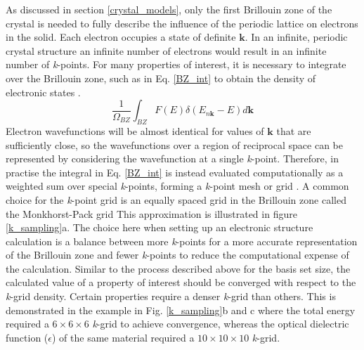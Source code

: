 \documentclass[11pt, twoside]{report}
\begin{document}
As discussed in section \ref{crystal_models}, only the first Brillouin zone of the crystal is needed to fully describe the influence of the periodic lattice on electrons in the solid.
Each electron occupies a state of definite $\mathbf{k}$. In an infinite, periodic crystal structure an infinite number of electrons would result in an infinite number of \textit{k}-points. For many properties of interest, it is necessary to integrate over the Brillouin zone, such as in Eq. \ref{BZ_int} to obtain the density of electronic states \cite{vasp_k-sampling_slides}.
\begin{equation}\label{BZ_int}
\frac{1}{\Omega_{BZ}} \int_{BZ} F(E)\delta(E_{n\mathbf{k}}-E)d\mathbf{k}    
\end{equation}
Electron wavefunctions will be almost identical for values of $\mathbf{k}$ that are sufficiently close, so the wavefunctions over a region of reciprocal space can be represented by considering the wavefunction at a single \textit{k}-point. Therefore, in practise the integral in Eq. \ref{BZ_int} is instead evaluated computationally as a weighted sum over special \textit{k}-points, forming a \textit{k}-point mesh or grid \cite{vasp_k-sampling_slides}. A common choice for the \textit{k}-point grid is an equally spaced grid in the Brillouin zone called the Monkhorst-Pack grid \cite{MonkhorstPack}
This approximation is illustrated in figure \ref{k_sampling}a. The choice here when setting up an electronic structure calculation is a balance between more \textit{k}-points for a more accurate representation of the Brillouin zone and fewer \textit{k}-points to reduce the computational expense of the calculation. Similar to the process described above for the basis set size, the calculated value of a property of interest should be converged with respect to the \textit{k}-grid density. Certain properties require a denser \textit{k}-grid than others. This is demonstrated in the example in Fig. \ref{k_sampling}b and c where the total energy required a $6\times6\times6$ \textit{k}-grid to achieve convergence, whereas the optical dielectric function ($\epsilon$) of the same material required a $10\times10\times10$ \textit{k}-grid.
\end{document}
